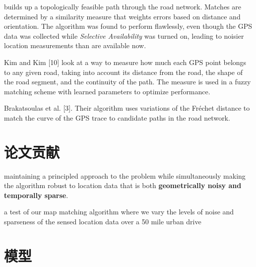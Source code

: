 builds up a
topologically feasible path through the road network. Matches are
determined by a similarity measure that weights errors based on
distance and orientation. The algorithm was found to perform flawlessly, even though the GPS data was collected while
\textit{Selective Availability} was turned on, leading to noisier location
measurements than are available now.

Kim and Kim [10] look at a
way to measure how much each GPS point belongs to any given
road, taking into account its distance from the road, the shape of
the road segment, and the continuity of the path. The measure is
used in a fuzzy matching scheme with learned parameters to
optimize performance.

Brakatsoulas et al. [3]. Their
algorithm uses variations of the Fréchet distance to match the
curve of the GPS trace to candidate paths in the road network.



\section{论文贡献}

maintaining a principled approach to the problem while simultaneously making
the algorithm robust to location data that is both \textbf{geometrically noisy and temporally sparse}.

a test of
our map matching algorithm where we vary the levels of noise
and sparseness of the sensed location data over a 50 mile urban
drive

\section{模型}

